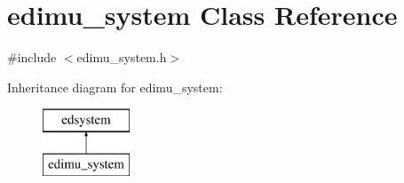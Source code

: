 \hypertarget{classedimu__system}{\section{edimu\-\_\-system Class Reference}
\label{classedimu__system}
}


{\ttfamily \#include $<$edimu\-\_\-system.\-h$>$}

Inheritance diagram for edimu\-\_\-system\-:\begin{figure}[H]
\begin{center}
\leavevmode
\includegraphics[height=2.000000cm]{classedimu__system}
\end{center}
\end{figure}
